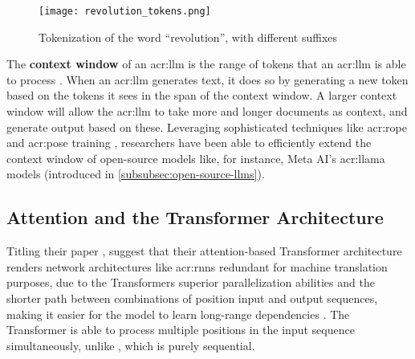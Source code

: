 \begin{figure}[htp]
    \centering
    \texttt{[image: revolution\_tokens.png]}
    \caption{Tokenization of the word \enquote{revolution}, with different suffixes}
    \label{fig:tokenization-revolution}
\end{figure}

The \textbf{context window} of an \acrshort{acr:llm} is the range of tokens that an \acrshort{acr:llm} is able to process \citep[1]{zhuPoSEEfficientContext2024}. When an \acrshort{acr:llm} generates text, it does so by generating a new token based on the tokens it sees in the span of the context window. A larger context window will allow the \acrshort{acr:llm} to take more and longer documents as context, and generate output based on these. Leveraging sophisticated techniques like \gls{acr:rope} \citep{suRoFormerEnhancedTransformer2024} and \gls{acr:pose} training \citep{zhuPoSEEfficientContext2024}, researchers have been able to efficiently extend the context window of open-source models like, for instance, Meta AI's \acrshort{acr:llama} models (introduced in \autoref{subsubsec:open-source-llms}).


\subsection{Attention and the Transformer Architecture}
\label{subsec:attention-and-the-transformer-architecture}

Titling their paper \textit{}, \citeauthor{vaswaniAttentionAllYou2017} suggest that their attention-based Transformer architecture renders network architectures like \glspl{acr:rnn} redundant for machine translation purposes, due to the Transformers superior parallelization abilities and the shorter path between combinations of position input and output sequences, making it easier for the model to learn long-range dependencies \citep[6]{vaswaniAttentionAllYou2017}. The Transformer is able to process multiple positions in the input sequence simultaneously, unlike , which is purely sequential.

